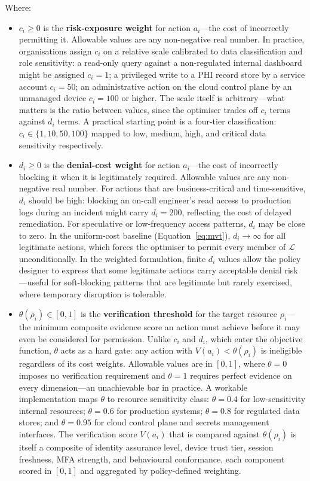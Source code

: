 \documentclass[acmlarge]{acmart}
\begin{document}
Where:
\begin{itemize}

\item $c_i \geq 0$ is the \textbf{risk-exposure weight} for action $a_i$---the cost
of incorrectly permitting it. Allowable values are any non-negative real number.
In practice, organisations assign $c_i$ on a relative scale calibrated to data
classification and role sensitivity: a read-only query against a non-regulated
internal dashboard might be assigned $c_i = 1$; a privileged write to a PHI
record store by a service account $c_i = 50$; an administrative action on the
cloud control plane by an unmanaged device $c_i = 100$ or higher. The scale
itself is arbitrary---what matters is the ratio between values, since the
optimiser trades off $c_i$ terms against $d_i$ terms. A practical starting
point is a four-tier classification: $c_i \in \{1, 10, 50, 100\}$ mapped to
low, medium, high, and critical data sensitivity respectively.

\item $d_i \geq 0$ is the \textbf{denial-cost weight} for action $a_i$---the cost
of incorrectly blocking it when it is legitimately required. Allowable values are
any non-negative real number. For actions that are business-critical and
time-sensitive, $d_i$ should be high: blocking an on-call engineer's read access
to production logs during an incident might carry $d_i = 200$, reflecting the
cost of delayed remediation. For speculative or low-frequency access patterns,
$d_i$ may be close to zero. In the uniform-cost baseline (Equation~\ref{eq:mvt}),
$d_i \to \infty$ for all legitimate actions, which forces the optimiser to
permit every member of $\mathcal{L}$ unconditionally. In the weighted
formulation, finite $d_i$ values allow the policy designer to express that some
legitimate actions carry acceptable denial risk---useful for soft-blocking
patterns that are legitimate but rarely exercised, where temporary disruption
is tolerable.

\item $\theta(\rho_i) \in [0, 1]$ is the \textbf{verification threshold} for the
target resource $\rho_i$---the minimum composite evidence score an action must
achieve before it may even be considered for permission. Unlike $c_i$ and $d_i$,
which enter the objective function, $\theta$ acts as a hard gate: any action
with $V(a_i) < \theta(\rho_i)$ is ineligible regardless of its cost weights.
Allowable values are in $[0, 1]$, where $\theta = 0$ imposes no verification
requirement and $\theta = 1$ requires perfect evidence on every dimension---an
unachievable bar in practice. A workable implementation maps $\theta$ to
resource sensitivity class: $\theta = 0.4$ for low-sensitivity internal
resources; $\theta = 0.6$ for production systems; $\theta = 0.8$ for regulated
data stores; and $\theta = 0.95$ for cloud control plane and secrets management
interfaces. The verification score $V(a_i)$ that is compared against
$\theta(\rho_i)$ is itself a composite of identity assurance level, device
trust tier, session freshness, MFA strength, and behavioural conformance, each
component scored in $[0, 1]$ and aggregated by policy-defined weighting.

\end{itemize}
\end{document}
